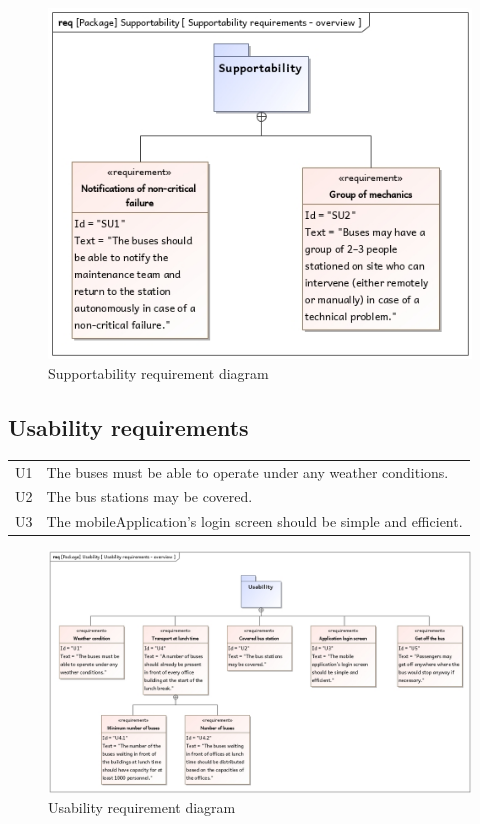 \documentclass[a4paper]{article}
\begin{document}
\begin{figure}
	\centering
	\includegraphics[width=.75\textwidth]{req-supportability.jpg}
	\caption{Supportability requirement diagram}%
	\label{fig:req-supportability}
\end{figure}

\subsection{Usability requirements}
\begin{tabularx}{\textwidth}{p{.75cm} X}
        U1 & The buses must be able to operate under any weather conditions. \\

        U2 & The bus \gls{station}s may be covered. \\

	U3 & The \gls{mobileApplication}’s login screen should be simple and
	     efficient. \\
\end{tabularx}

\begin{figure}
	\centering
	\includegraphics[width=\textwidth]{req-usability.jpg} %
	\caption{Usability requirement diagram}%
	\label{fig:req-usability}
\end{figure}
\end{document}
